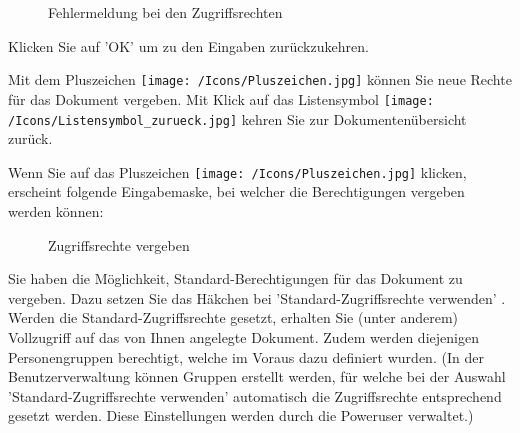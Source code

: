 \begin{figure}[H]
\caption{Fehlermeldung bei den Zugriffsrechten}
\end{figure}

Klicken Sie auf 'OK' um zu den Eingaben zurückzukehren. 

\vspace{\baselineskip}

Mit dem Pluszeichen \texttt{[image: /Icons/Pluszeichen.jpg]}  können Sie neue Rechte für das Dokument vergeben. Mit Klick auf das Listensymbol \texttt{[image: /Icons/Listensymbol\_zurueck.jpg]}  kehren Sie zur Dokumentenübersicht zurück.

\vspace{\baselineskip}

Wenn Sie auf das Pluszeichen \texttt{[image: /Icons/Pluszeichen.jpg]}  klicken, erscheint folgende Eingabemaske, bei welcher die Berechtigungen vergeben werden können:

\begin{figure}[H]
\caption{Zugriffsrechte vergeben}
\end{figure}

Sie haben die Möglichkeit, Standard-Berechtigungen für das Dokument zu vergeben. Dazu setzen Sie das Häkchen bei 'Standard-Zugriffsrechte verwenden' . Werden die Standard-Zugriffsrechte gesetzt, erhalten Sie (unter anderem) Vollzugriff auf das von Ihnen angelegte Dokument. Zudem werden diejenigen Personengruppen berechtigt, welche im Voraus dazu definiert wurden. (In der Benutzerverwaltung können Gruppen erstellt werden, für welche bei der Auswahl 'Standard-Zugriffsrechte verwenden' automatisch die Zugriffsrechte entsprechend gesetzt werden. Diese Einstellungen werden durch die Poweruser verwaltet.)

